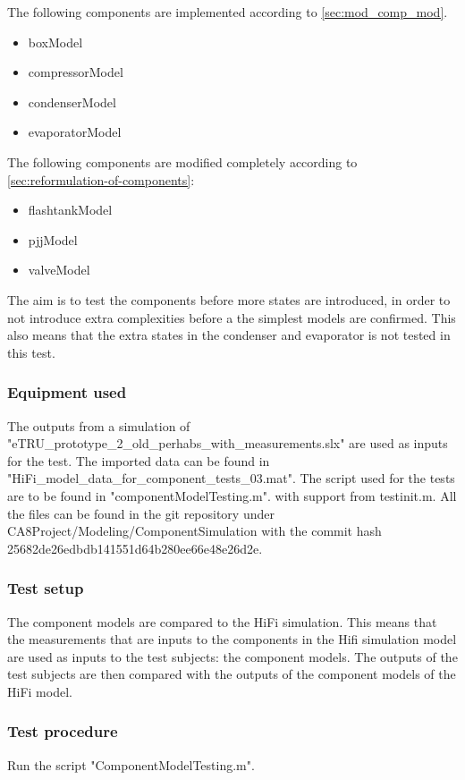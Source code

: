 The following components are implemented according to \cref{sec:mod_comp_mod}.
\begin{itemize}
	\item boxModel
	\item compressorModel
	\item condenserModel
	\item evaporatorModel
\end{itemize}

The following components are modified completely according to \cref{sec:reformulation-of-components}:

\begin{itemize}
	\item flashtankModel
	\item pjjModel
	\item valveModel
\end{itemize}

The aim is to test the components before more states are introduced, in order to not introduce extra complexities before a the simplest models are confirmed. This also means that the extra states in the condenser and evaporator is not tested in this test.


\subsubsection*{Equipment used}
The outputs from a simulation of "eTRU\_prototype\_2\_old\_perhabs\_with\_measurements.slx" are used as inputs for the test. The imported data can be found in "HiFi\_model\_data\_for\_component\_tests\_03.mat".
The script used for the tests are to be found in "componentModelTesting.m". with support from testinit.m.
All the files can be found in the git repository under CA8Project/Modeling/ComponentSimulation with the commit hash 25682de26edbdb141551d64b280ee66e48e26d2e.

\subsubsection*{Test setup}
The component models are compared to the HiFi simulation. This means that the measurements that are inputs to the components in the Hifi simulation model are used as inputs to the test subjects: the component models. The outputs of the test subjects are then compared with the outputs of the component models of the HiFi model.

\subsubsection*{Test procedure}
Run the script "ComponentModelTesting.m".

